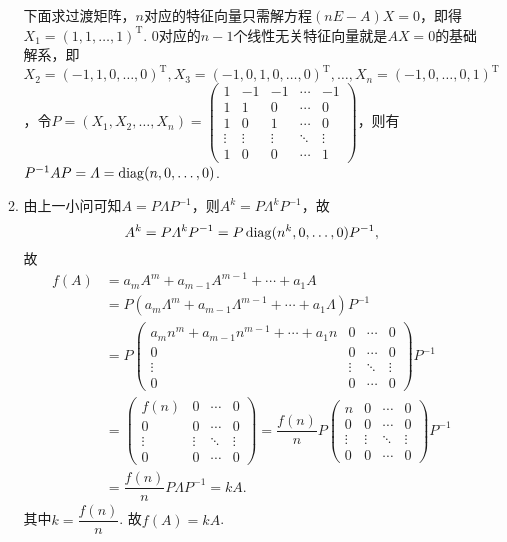 \begin{enumerate}
\begin{enumerate}
                    下面求过渡矩阵，$n$对应的特征向量只需解方程$(nE-A)X=0$，即得$X_1=(1,1,\ldots,1)^\mathrm{T}$. 0对应的$n-1$个线性无关特征向量就是$AX=0$的基础解系，即$X_2=(-1,1,0,\ldots,0)^\mathrm{T},X_3=(-1,0,1,0,\ldots,0)^\mathrm{T},\ldots,X_n=(-1,0,\ldots,0,1)^\mathrm{T}$，令$P=(X_1,X_2,\ldots,X_n)=\begin{pmatrix}
                            1 & -1 & -1 & \cdots & -1 \\ 1 & 1 & 0 & \cdots & 0 \\ 1 & 0 & 1 & \cdots & 0 \\ \vdots & \vdots & \vdots & \ddots & \vdots \\ 1 & 0 & 0 & \cdots & 1
                        \end{pmatrix}$，则有$P^{-1}AP=\varLambda=\operatorname{diag}(n,0,\ldots,0)$.

              \item 由上一小问可知$A=P\varLambda P^{-1}$，则$A^k=P\varLambda^kP^{-1}$，故
                    \[A^k=P\varLambda^kP^{-1}=P\operatorname{diag}(n^k,0,\ldots,0)P^{-1},\]
                    故
                    \begin{align*}
                        f(A) & =a_mA^m+a_{m-1}A^{m-1}+\cdots+a_1A                                                                                                   \\
                             & =P(a_m\varLambda^m+a_{m-1}\varLambda^{m-1}+\cdots+a_1\varLambda)P^{-1}                                                               \\
                             & =P\begin{pmatrix}
                                     a_mn^m+a_{m-1}n^{m-1}+\cdots+a_1n & 0 & \cdots & 0 \\ 0 & 0 & \cdots & 0 \\ \vdots & \vdots & \ddots & \vdots \\ 0 & 0 & \cdots & 0
                                 \end{pmatrix}P^{-1} \\
                             & =\begin{pmatrix}
                                    f(n) & 0 & \cdots & 0 \\ 0 & 0 & \cdots & 0 \\ \vdots & \vdots & \ddots & \vdots \\ 0 & 0 & \cdots & 0
                                \end{pmatrix}=\dfrac{f(n)}{n}P\begin{pmatrix}
                                                                  n & 0 & \cdots & 0 \\ 0 & 0 & \cdots & 0 \\ \vdots & \vdots & \ddots & \vdots \\ 0 & 0 & \cdots & 0
                                                              \end{pmatrix}P^{-1}    \\
                             & =\dfrac{f(n)}{n}P\varLambda P^{-1}=kA.
                    \end{align*}
                    其中$k=\dfrac{f(n)}{n}$. 故$f(A)=kA$.


\end{enumerate}
\end{enumerate}
